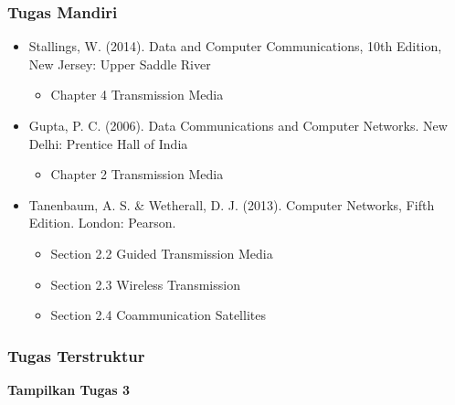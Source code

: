 \documentclass[pdflatex,compress]{beamer}
\begin{document}

\begin{frame}
	\frametitle{Tugas Mandiri}
	\begin{itemize}
		\item Stallings, W. (2014). Data and Computer Communications, 10th Edition, New Jersey: Upper Saddle River\\
		\begin{itemize}
			\item Chapter 4 Transmission Media
		\end{itemize}
		\item Gupta, P. C. (2006). Data Communications and Computer Networks. New Delhi: Prentice Hall of India\\
		\begin{itemize}
			\item Chapter 2 Transmission Media
		\end{itemize}
		\item Tanenbaum, A. S. \& Wetherall, D. J. (2013). Computer Networks, Fifth Edition. London: Pearson.\\
		\begin{itemize}
			\item Section 2.2 Guided Transmission Media
			\item Section 2.3 Wireless Transmission
			\item Section 2.4 Coammunication Satellites
		\end{itemize}
	\end{itemize}
\end{frame}

\begin{frame}
	\frametitle{Tugas Terstruktur}
	\textbf{Tampilkan Tugas 3}
\end{frame}
\end{document}
